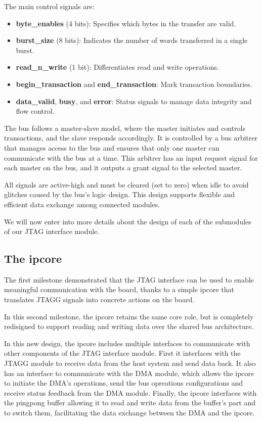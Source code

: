 \documentclass[a4paper,11pt,oneside]{report}
\begin{document}
The main control signals are:

\begin{itemize}
    \item \textbf{byte\_enables} (4 bits): Specifies which bytes in the transfer are valid.
    \item \textbf{burst\_size} (8 bits): Indicates the number of words transferred in a single burst.
    \item \textbf{read\_n\_write} (1 bit): Differentiates read and write operations.
    \item \textbf{begin\_transaction} and \textbf{end\_transaction}: Mark transaction boundaries.
    \item \textbf{data\_valid}, \textbf{busy}, and \textbf{error}: Status signals to manage data integrity and flow control.
\end{itemize}

The bus follows a master-slave model, where the master initiates and controls transactions, and the slave responds accordingly. It is
controlled by a bus arbitrer that manages access to the bus and ensures that only one master can communicate with the bus at a time.
This arbitrer has an input request signal for each master on the bus, and it outputs a grant signal to the selected master.

All signals are active-high and must be cleared (set to zero) when idle to avoid glitches caused by the bus’s logic design. 
This design supports flexible and efficient data exchange among connected modules.

We will now enter into more details about the design of each of the submodules of our JTAG interface module.

\subsection{The ipcore}

The first milestone demonstrated that the JTAG interface can be used to enable meaningful communication with the board, thanks to a simple ipcore that translates JTAGG signals into concrete actions on the board.

In this second milestone, the ipcore retains the same core role, but is completely redisigned to support reading and writing data over the shared bus architecture.

In this new design, the ipcore includes multiple interfaces to communicate with other components of the JTAG interface module.  
First it interfaces with the JTAGG module to receive data from the host system and send data back.
It also has an interface to communicate with the DMA module, which allows the ipcore to initiate the DMA's operations, send the bus opreations configurations and 
receive status feedback from the DMA module.
Finally, the ipcore interfaces with the pingpong buffer allowing it to read and write data from the buffer's part and to switch them, facilitating the data exchange between the DMA and the ipcore.
\end{document}
